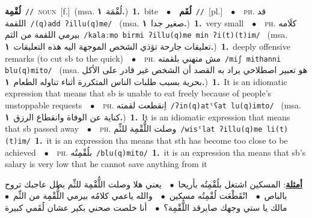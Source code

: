 \documentclass[10pt,a4paper,twoside]{article} %
\begin{document}
\begin{multicols}{2}
{\setlength\topsep{0pt}\textbf{\foreignlanguage{arabic}{لُقْمِة}}\ {\color{gray}\texttt{//}\color{black}}\ \textsc{noun}\ [f.]\ \color{gray}(msa. \foreignlanguage{arabic}{لُقْمَة}~\foreignlanguage{arabic}{\textbf{١.}})\color{black}\ \textbf{1.}~bite\ \ $\bullet$\ \ \setlength\topsep{0pt}\textbf{\foreignlanguage{arabic}{لُقَم}}\ {\color{gray}\texttt{//}\color{black}}\ [pl.]\ \ $\bullet$\ \ \textsc{ph.} \color{gray} \foreignlanguage{arabic}{قد اللقمة}\color{black}\ {\color{gray}\texttt{/{\sffamily (q)add ʔillu(q)me}/}\color{black}}\ \color{gray} (msa. \foreignlanguage{arabic}{صغير جدا}~\foreignlanguage{arabic}{\textbf{١.}})\color{black}\ \textbf{1.}~very small\ \ $\bullet$\ \ \textsc{ph.} \color{gray} \foreignlanguage{arabic}{كلَامه بيرمي اللقمة من الثم}\color{black}\ {\color{gray}\texttt{/{\sffamily kalaːmo birmi ʔillu(q)me min ʔi(t)(t)im}/}\color{black}}\ \color{gray} (msa. \foreignlanguage{arabic}{تعليقات جارحة تؤذي الشخص الموجهة اليه هذه التعليقات}~\foreignlanguage{arabic}{\textbf{١.}})\color{black}\ \textbf{1.}~deeply offensive remarks (to cut sb to the quick)\ \ $\bullet$\ \ \textsc{ph.} \color{gray} \foreignlanguage{arabic}{مش متهني بلقمته}\color{black}\ {\color{gray}\texttt{/{\sffamily miʃ mithanni blu(q)mito}/}\color{black}}\ \color{gray} (msa. \foreignlanguage{arabic}{هو تعبير اصطلاحي يراد به القصد أن الشخص غير قادر على الأكل بحرية بسبب طلبات الناس المتكررة أثناء تناوله الطعام}~\foreignlanguage{arabic}{\textbf{١.}})\color{black}\ \textbf{1.}~It is an idiomatic expression that means that sb is unable to eat freely because of people's unstoppable requests\ \ $\bullet$\ \ \textsc{ph.} \color{gray} \foreignlanguage{arabic}{اِنقطعت لقمته}\color{black}\ {\color{gray}\texttt{/{\sffamily ʔin(q)atˤʕat lu(q)imto}/}\color{black}}\ \color{gray} (msa. \foreignlanguage{arabic}{كناية عن الوفاة وانقطاع الرزق}~\foreignlanguage{arabic}{\textbf{١.}})\color{black}\ \textbf{1.}~It is an idiomatic expression that means that sb passed away\ \ $\bullet$\ \ \textsc{ph.} \color{gray} \foreignlanguage{arabic}{وصلت اللُّقْمِة للثِّم}\color{black}\ {\color{gray}\texttt{/{\sffamily wisˤlat ʔillu(q)me li(t)(t)im}/}\color{black}}\ \textbf{1.}~it is an expression tha means that sth has become too close to be achieved\ \ $\bullet$\ \ \textsc{ph.} \color{gray} \foreignlanguage{arabic}{بلُقْمِتُه}\color{black}\ {\color{gray}\texttt{/{\sffamily blu(q)mito}/}\color{black}}\ \textbf{1.}~it is an expression tha means that sb's salary is very low that he cannot save anything from it\  \begin{flushright}\color{gray}\foreignlanguage{arabic}{\textbf{\underline{\foreignlanguage{arabic}{أمثلة}}}: المسكين اشتغل بلُقْمِتُه بأريحا\ $\bullet$\ \  يعني هلا وصلت اللُّقْمِة للثِّم بطل عاجبك تروح بالباص\ $\bullet$\ \  انْقَطْعَت لُقْمِتُه مسكين\ $\bullet$\ \  والله ياعمي كلامُه بيرمي اللُّقْمِة من الثِّم\ $\bullet$\ \  مالك يا ستي وجهك صايرقد اللُّقْمِة؟\ $\bullet$\ \  أنا خلصت صحني بكير عشان لُقَمي كبيرة}\end{flushright}\color{black}} \vspace{2mm}


\end{multicols}
\end{document}

